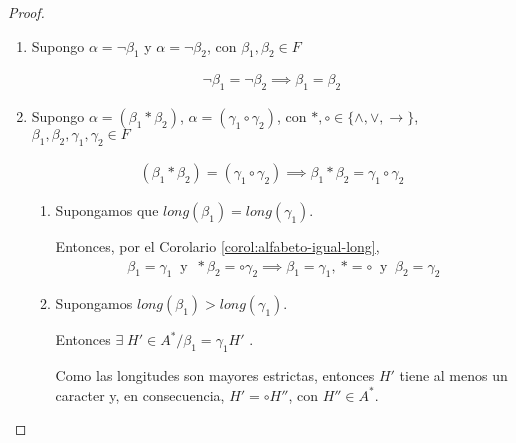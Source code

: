 \begin{proof} \phantom{.}

    \begin{enumerate}
        \item Supongo $\alpha = \neg \beta_1$ y $\alpha = \neg \beta_2$, con
            $\beta_1, \beta_2 \in F$

            \begin{gather*}
                \neg \beta_1 = \neg \beta_2 \implies \beta_1 = \beta_2
            \end{gather*}

        \item Supongo $\alpha = ( \beta_1 * \beta_2)$, 
            $\alpha = (\gamma_1 \circ \gamma_2)$, con 
            $*, \circ \in \{ \wedge,\vee,\to \}$, $\beta_1, \beta_2, 
            \gamma_1, \gamma_2 \in F$

            \begin{gather*}
                (\beta_1*\beta_2) = (\gamma_1 \circ \gamma_2)
                \implies \beta_1 * \beta_2 = \gamma_1 \circ \gamma_2
            \end{gather*}

            \begin{enumerate}
                \item Supongamos que $long(\beta_1) = long(\gamma_1)$.

                    Entonces, por el Corolario \ref{corol:alfabeto-igual-long},
                    \begin{gather*}
                        \beta_1 = \gamma_1
                        ~ \text{ y } ~
                        *\beta_2 = \circ \gamma_2
                        \implies \beta_1 = \gamma_1,
                        ~ * = \circ
                        ~ \text{ y } ~
                        \beta_2 = \gamma_2
                    \end{gather*}
                    
                \item Supongamos $long(\beta_1) > long(\gamma_1)$.

                    Entonces 
                    $\exists \; H'\in A^{*} / \beta_1 = \gamma_1 H'$
                    .

                    Como las longitudes son mayores estrictas, entonces $H'$
                    tiene al menos un caracter y, en consecuencia, 
                    $H'=\circ H''$, con $H'' \in A^{*}$.


\end{enumerate}
\end{enumerate}
\end{proof}
